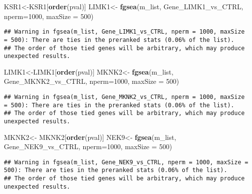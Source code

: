 \documentclass[]{article}
\newenvironment{Shaded}{\begin{snugshade}}{\end{snugshade}}
\newcommand{\KeywordTok}[1]{\textcolor[rgb]{0.13,0.29,0.53}{\textbf{#1}}}
\newcommand{\DataTypeTok}[1]{\textcolor[rgb]{0.13,0.29,0.53}{#1}}
\newcommand{\DecValTok}[1]{\textcolor[rgb]{0.00,0.00,0.81}{#1}}
\newcommand{\StringTok}[1]{\textcolor[rgb]{0.31,0.60,0.02}{#1}}
\newcommand{\NormalTok}[1]{#1}
\begin{document}
\begin{Shaded}
\begin{Highlighting}[]
\NormalTok{KSR1<-KSR1[}\KeywordTok{order}\NormalTok{(pval)]}
\NormalTok{LIMK1<-}\StringTok{ }\KeywordTok{fgsea}\NormalTok{(m_list, Gene_LIMK1_vs_CTRL, }\DataTypeTok{nperm=}\DecValTok{1000}\NormalTok{, }\DataTypeTok{maxSize =} \DecValTok{500}\NormalTok{)}
\end{Highlighting}
\end{Shaded}

\begin{verbatim}
## Warning in fgsea(m_list, Gene_LIMK1_vs_CTRL, nperm = 1000, maxSize = 500): There are ties in the preranked stats (0.06% of the list).
## The order of those tied genes will be arbitrary, which may produce unexpected results.
\end{verbatim}

\begin{Shaded}
\begin{Highlighting}[]
\NormalTok{LIMK1<-LIMK1[}\KeywordTok{order}\NormalTok{(pval)]}
\NormalTok{MKNK2<-}\StringTok{ }\KeywordTok{fgsea}\NormalTok{(m_list, Gene_MKNK2_vs_CTRL, }\DataTypeTok{nperm=}\DecValTok{1000}\NormalTok{, }\DataTypeTok{maxSize =} \DecValTok{500}\NormalTok{)}
\end{Highlighting}
\end{Shaded}

\begin{verbatim}
## Warning in fgsea(m_list, Gene_MKNK2_vs_CTRL, nperm = 1000, maxSize = 500): There are ties in the preranked stats (0.06% of the list).
## The order of those tied genes will be arbitrary, which may produce unexpected results.
\end{verbatim}

\begin{Shaded}
\begin{Highlighting}[]
\NormalTok{MKNK2<-}\StringTok{ }\NormalTok{MKNK2[}\KeywordTok{order}\NormalTok{(pval)]}
\NormalTok{NEK9<-}\StringTok{ }\KeywordTok{fgsea}\NormalTok{(m_list, Gene_NEK9_vs_CTRL, }\DataTypeTok{nperm=}\DecValTok{1000}\NormalTok{, }\DataTypeTok{maxSize =} \DecValTok{500}\NormalTok{)}
\end{Highlighting}
\end{Shaded}

\begin{verbatim}
## Warning in fgsea(m_list, Gene_NEK9_vs_CTRL, nperm = 1000, maxSize = 500): There are ties in the preranked stats (0.06% of the list).
## The order of those tied genes will be arbitrary, which may produce unexpected results.
\end{verbatim}
\end{document}

